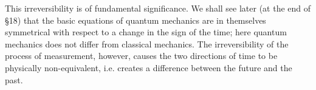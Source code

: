 This irreversibility is of fundamental significance. We shall see later (at the end of §18) that the basic equations of quantum mechanics are in themselves symmetrical with respect to a change in the sign of the time; here quantum mechanics does not differ from classical mechanics. The irreversibility of the process of measurement, however, causes the two directions of time to be physically non-equivalent, i.e. creates a difference between the future and the past.
		
		
		
		



